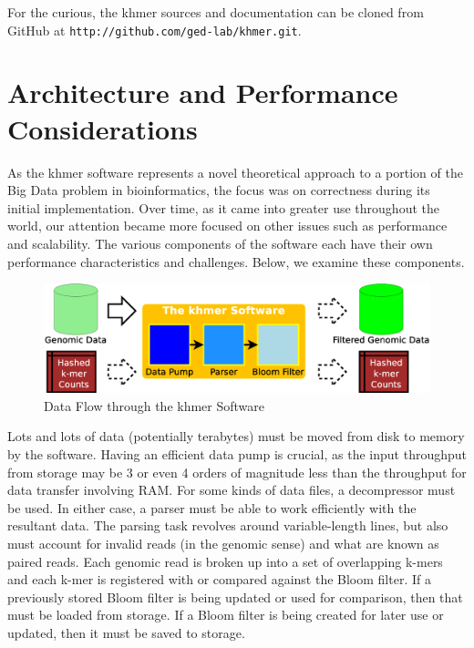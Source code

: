 \documentclass{article}
\begin{document}

For the curious, the khmer sources and documentation can be cloned from GitHub at \texttt{http://github.com/ged-lab/khmer.git}.

\section{Architecture and Performance Considerations}


As the khmer software represents a novel theoretical approach to a portion of the Big Data problem in bioinformatics, the focus was on correctness during its initial implementation. Over time, as it came into greater use throughout the world, our attention became more focused on other issues such as performance and scalability. The various components of the software each have their own performance characteristics and challenges. Below, we examine these components.

\begin{figure}[ht!]
\centering
\includegraphics[scale=0.4]{data_flow.eps}
\caption{Data Flow through the khmer Software}
\label{khmerDataFlow}
\end{figure}

Lots and lots of data (potentially terabytes) must be moved from disk to memory by the software. Having an efficient data pump is crucial, as the input throughput from storage may be 3 or even 4 orders of magnitude less than the throughput for data transfer involving RAM. For some kinds of data files, a decompressor must be used. In either case, a parser must be able to work efficiently with the resultant data. The parsing task revolves around variable-length lines, but also must account for invalid reads (in the genomic sense) and what are known as paired reads. Each genomic read is broken up into a set of overlapping k-mers and each k-mer is registered with or compared against the Bloom filter. If a previously stored Bloom filter is being updated or used for comparison, then that must be loaded from storage. If a Bloom filter is being created for later use or updated, then it must be saved to storage.
\end{document}
